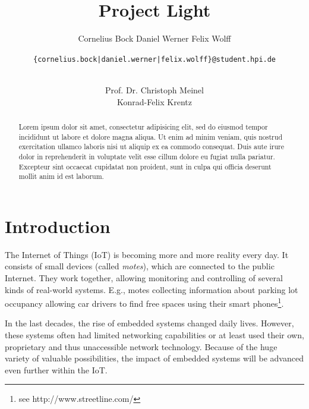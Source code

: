 \documentclass{sig-alternate} %
\begin{document}
\title{Project Light}


\author{
\alignauthor
Cornelius Bock
%
\alignauthor
Daniel Werner
%
\alignauthor
Felix Wolff
%
\and
\texttt{\{cornelius.bock|daniel.werner|felix.wolff\}@student.hpi.de} \\ \\
\and
\alignauthor
Prof. Dr. Christoph Meinel\\
%
\alignauthor
Konrad-Felix Krentz\\
}

\maketitle

\begin{abstract}
Lorem ipsum dolor sit amet, consectetur adipisicing elit, sed do eiusmod
tempor incididunt ut labore et dolore magna aliqua. Ut enim ad minim veniam,
quis nostrud exercitation ullamco laboris nisi ut aliquip ex ea commodo
consequat. Duis aute irure dolor in reprehenderit in voluptate velit esse
cillum dolore eu fugiat nulla pariatur. Excepteur sint occaecat cupidatat non
proident, sunt in culpa qui officia deserunt mollit anim id est laborum.
\end{abstract}




\section{Introduction}
\label{sec:introduction}

The Internet of Things (IoT) is becoming more and more reality every day.
It consists of small devices (called \textit{motes}), which are connected to the public Internet.
They work together, allowing monitoring and controlling of several kinds of real-world systems. %
E.g., motes collecting information about parking lot occupancy allowing car drivers to find free spaces using their smart phones\footnote{see http://www.streetline.com/}.

In the last decades, the rise of embedded systems changed daily lives. %
However, these systems often had limited networking capabilities or at least used their own, proprietary and thus unaccessible network technology.
Because of the huge variety of valuable possibilities, the impact of embedded systems will be advanced even further within the IoT.
\end{document}

